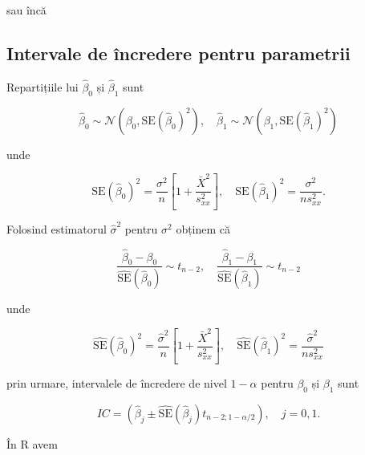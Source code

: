 \documentclass[]{article}
\newenvironment{Shaded}{\begin{snugshade}}{\end{snugshade}}
\newcommand{\KeywordTok}[1]{\textcolor[rgb]{0.13,0.29,0.53}{\textbf{#1}}}
\newcommand{\DecValTok}[1]{\textcolor[rgb]{0.00,0.00,0.81}{#1}}
\newcommand{\FloatTok}[1]{\textcolor[rgb]{0.00,0.00,0.81}{#1}}
\newcommand{\StringTok}[1]{\textcolor[rgb]{0.31,0.60,0.02}{#1}}
\newcommand{\OperatorTok}[1]{\textcolor[rgb]{0.81,0.36,0.00}{\textbf{#1}}}
\newcommand{\NormalTok}[1]{#1}
\begin{document}
sau încă

\begin{Shaded}
\end{Shaded}

\subsection{Intervale de încredere pentru
parametrii}\label{intervale-de-incredere-pentru-parametrii}

Repartițiile lui \(\hat\beta_0\) și \(\hat\beta_1\) sunt

\[
\hat\beta_0\sim\mathcal{N}\left(\beta_0,\mathrm{SE}(\hat\beta_0)^2\right),\quad\hat\beta_1\sim\mathcal{N}\left(\beta_1,\mathrm{SE}(\hat\beta_1)^2\right)
\]

unde

\[
\mathrm{SE}(\hat\beta_0)^2=\frac{\sigma^2}{n}\left[1+\frac{\bar X^2}{s_{xx}^2}\right],\quad \mathrm{SE}(\hat\beta_1)^2=\frac{\sigma^2}{ns_{xx}^2}.
\]

Folosind estimatorul \(\hat\sigma^2\) pentru \(\sigma^2\) obținem că

\[
\frac{\hat\beta_0-\beta_0}{\hat{\mathrm{SE}}(\hat\beta_0)}\sim t_{n-2},\quad\frac{\hat\beta_1-\beta_1}{\hat{\mathrm{SE}}(\hat\beta_1)}\sim t_{n-2}
\]

unde

\[
\hat{\mathrm{SE}}(\hat\beta_0)^2=\frac{\hat\sigma^2}{n}\left[1+\frac{\bar X^2}{s_{xx}^2}\right],\quad \hat{\mathrm{SE}}(\hat\beta_1)^2=\frac{\hat\sigma^2}{ns_{xx}^2}
\]

prin urmare, intervalele de încredere de nivel \(1-\alpha\) pentru
\(\beta_0\) și \(\beta_1\) sunt

\[
IC = \left(\hat\beta_j\pm\hat{\mathrm{SE}}(\hat\beta_j)t_{n-2;1-\alpha/2}\right),\quad j=0,1.
\]

În R avem
\end{document}
